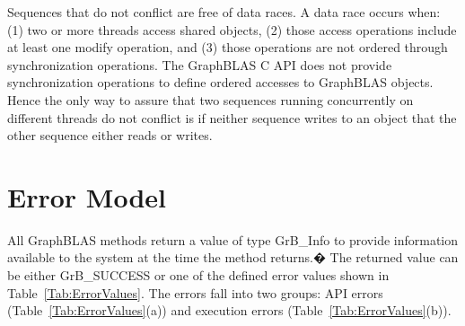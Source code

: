 Sequences that do not conflict are free of data races.  A data race occurs
when: (1) two or more threads access shared objects, (2) those access 
operations include at least one modify operation,
and (3) those operations are not ordered through synchronization operations.   
The GraphBLAS C API does not provide synchronization operations to define 
ordered accesses to GraphBLAS objects. Hence the only way to assure that 
two sequences running concurrently on different threads do not 
conflict is if neither sequence writes to an object that the other 
sequence either reads or writes.


\section{Error Model}
\label{Sec:ErrorModel}

All GraphBLAS methods return a value of type {\sf GrB\_Info} to provide
information available to the system at the time the method returns.� The
returned value can be either {\sf GrB\_SUCCESS} or one of the defined
error values shown in Table~\ref{Tab:ErrorValues}. The errors fall into
two groups: API errors (Table~\ref{Tab:ErrorValues}(a)) and execution
errors (Table~\ref{Tab:ErrorValues}(b)).

